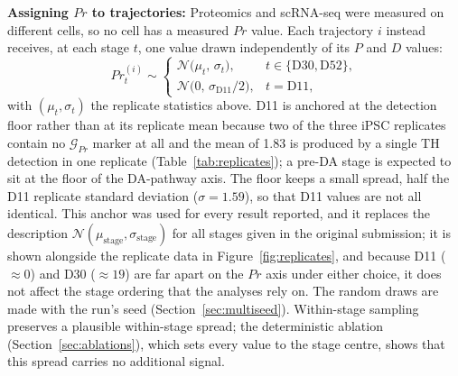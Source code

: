 \documentclass[5p,times,twocolumn]{elsarticle}
\newcommand{\rtag}[1]{}
\newenvironment{revblock}[1]{\par\color{red}\rtag{#1}\ignorespaces}{\par}
\begin{document}
\begin{revblock}{R1.2,R2.6,AC}
  \textbf{Assigning $Pr$ to trajectories:}
  Proteomics and scRNA-seq were measured on different cells, so
  no cell has a measured $Pr$ value. Each trajectory $i$ instead
  receives, at each stage $t$, one value drawn independently of
  its $P$ and $D$ values:
  \begin{equation}
  Pr^{(i)}_{t} \sim
  \begin{cases}
    \mathcal{N}\bigl(\mu_{t},\, \sigma_{t}\bigr),
      & t \in \{\text{D30}, \text{D52}\},\\[2pt]
    \mathcal{N}\bigl(0,\, \sigma_{\text{D11}}/2\bigr),
      & t = \text{D11},
  \end{cases}
  \label{eq:prsample}
  \end{equation}
  with $(\mu_{t}, \sigma_{t})$ the replicate statistics above.
  D11 is anchored at the detection floor rather than at its
  replicate mean because two of the three iPSC replicates contain
  no $\mathcal{G}_{Pr}$ marker at all and the mean of 1.83 is
  produced by a single TH detection in one replicate
  (Table~\ref{tab:replicates}); a pre-DA stage is expected to sit
  at the floor of the DA-pathway axis. The floor keeps a small
  spread, half the D11 replicate standard deviation
  ($\sigma = 1.59$), so that D11 values are not all identical.
  This anchor was used for every result reported, and it
  replaces the description $\mathcal{N}(\mu_{\text{stage}},
\sigma_{\text{stage}})$ for all stages given in the original
  submission;
  it is shown alongside the replicate data in
  Figure~\ref{fig:replicates}, and because D11 ($\approx 0$)
  and D30 ($\approx 19$) are far apart on the $Pr$ axis under
  either choice, it does not affect the stage ordering that the
  analyses rely on.
  The random draws are made with the run's seed
  (Section~\ref{sec:multiseed}).
  Within-stage sampling preserves a plausible within-stage
  spread; the deterministic ablation
  (Section~\ref{sec:ablations}), which sets every value to the
  stage centre, shows that this spread carries no additional
  signal.
\end{revblock}
\end{document}

